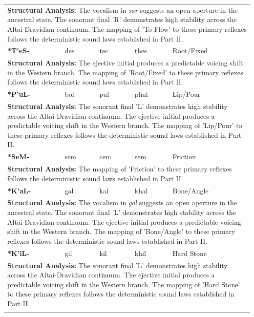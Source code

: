 \begin{longtable}{p{} p{} p{} p{} p{}}
\multicolumn{5}{p{\textwidth}}{\small \textbf{Structural Analysis:} The vocalism in \textit{sar} suggests an open aperture in the ancestral state. The sonorant final 'R' demonstrates high stability across the Altai-Dravidian continuum. The mapping of 'To Flow' to these primary reflexes follows the deterministic sound laws established in Part II.} \\ \addlinespace[15pt] 
\textbf{*T'eS-} & des & tec & thes & Root/Fixed \\ 
\multicolumn{5}{p{\textwidth}}{\small \textbf{Structural Analysis:} The ejective initial produces a predictable voicing shift in the Western branch. The mapping of 'Root/Fixed' to these primary reflexes follows the deterministic sound laws established in Part II.} \\ \addlinespace[15pt] 
\textbf{*P'uL-} & bol & pul & phul & Lip/Pour \\ 
\multicolumn{5}{p{\textwidth}}{\small \textbf{Structural Analysis:} The sonorant final 'L' demonstrates high stability across the Altai-Dravidian continuum. The ejective initial produces a predictable voicing shift in the Western branch. The mapping of 'Lip/Pour' to these primary reflexes follows the deterministic sound laws established in Part II.} \\ \addlinespace[15pt] 
\textbf{*SeM-} & sem & cem & sem & Friction \\ 
\multicolumn{5}{p{\textwidth}}{\small \textbf{Structural Analysis:}  The mapping of 'Friction' to these primary reflexes follows the deterministic sound laws established in Part II.} \\ \addlinespace[15pt] 
\textbf{*K'aL-} & gal & kal & khal & Bone/Angle \\ 
\multicolumn{5}{p{\textwidth}}{\small \textbf{Structural Analysis:} The vocalism in \textit{gal} suggests an open aperture in the ancestral state. The sonorant final 'L' demonstrates high stability across the Altai-Dravidian continuum. The ejective initial produces a predictable voicing shift in the Western branch. The mapping of 'Bone/Angle' to these primary reflexes follows the deterministic sound laws established in Part II.} \\ \addlinespace[15pt] 
\textbf{*K'iL-} & gil & kil & khil & Hard Stone \\ 
\multicolumn{5}{p{\textwidth}}{\small \textbf{Structural Analysis:} The sonorant final 'L' demonstrates high stability across the Altai-Dravidian continuum. The ejective initial produces a predictable voicing shift in the Western branch. The mapping of 'Hard Stone' to these primary reflexes follows the deterministic sound laws established in Part II.} \\ \addlinespace[15pt] 

\end{longtable}
